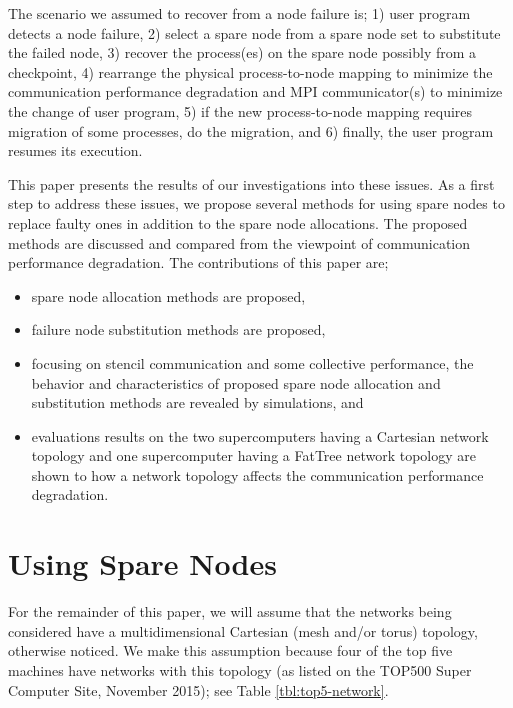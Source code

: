 \documentclass[Afour,times,sageh]{sagej}
\begin{document}
The scenario we assumed to recover from a node failure is;
1) user program detects a node failure, 2) select a spare node from a
spare node set to substitute the failed node, 3) recover the
process(es) on the spare node possibly from a checkpoint, 4)
rearrange the physical process-to-node mapping to minimize the
communication performance degradation and MPI communicator(s) to
minimize the change of user program, 5) if the new process-to-node
mapping requires migration of some processes, do the migration, and
6) finally, the user program
resumes its execution.

This paper presents the results of our investigations into these
issues. As a first step to address these issues, we propose several
methods for using spare nodes to replace faulty ones in addition to
the spare node allocations. The proposed methods are discussed and
compared from the viewpoint of communication performance
degradation. The contributions of this paper are;

\begin{itemize}
\item spare node allocation methods are proposed,
\item failure node substitution methods are proposed,
\item focusing on stencil communication and some collective
  performance, the behavior and characteristics of proposed spare
  node allocation and substitution methods are revealed by simulations, and
\item evaluations results on the two supercomputers having a Cartesian
  network topology and one supercomputer having a FatTree network
  topology are shown to how a network topology affects the communication
  performance degradation.
\end{itemize}

\section{Using Spare Nodes}

For the remainder of this paper, we will assume that the networks
being considered have a multidimensional Cartesian (mesh and/or torus)
topology, otherwise noticed. We make this assumption because four of
the top five machines have networks with this topology (as listed on
the TOP500 Super Computer Site\citep{top500}, November
2015); see Table \ref{tbl:top5-network}.
\end{document}

